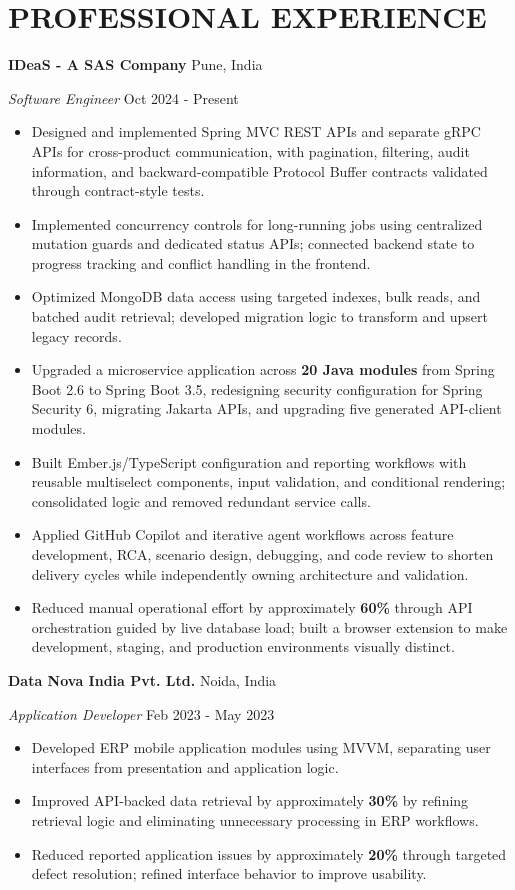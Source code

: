 \documentclass[a4paper,10pt]{article}
\begin{document}
\section{PROFESSIONAL EXPERIENCE}
\textbf{IDeaS - A SAS Company} \hfill Pune, India\par
\textit{Software Engineer} \hfill Oct 2024 - Present\par
\begin{itemize}
\item Designed and implemented Spring MVC REST APIs and separate gRPC APIs for cross-product communication, with pagination, filtering, audit information, and backward-compatible Protocol Buffer contracts validated through contract-style tests.
\item Implemented concurrency controls for long-running jobs using centralized mutation guards and dedicated status APIs; connected backend state to progress tracking and conflict handling in the frontend.
\item Optimized MongoDB data access using targeted indexes, bulk reads, and batched audit retrieval; developed migration logic to transform and upsert legacy records.
\item Upgraded a microservice application across \textbf{20 Java modules} from Spring Boot 2.6 to Spring Boot 3.5, redesigning security configuration for Spring Security 6, migrating Jakarta APIs, and upgrading five generated API-client modules.
\item Built Ember.js/TypeScript configuration and reporting workflows with reusable multiselect components, input validation, and conditional rendering; consolidated logic and removed redundant service calls.
\item Applied GitHub Copilot and iterative agent workflows across feature development, RCA, scenario design, debugging, and code review to shorten delivery cycles while independently owning architecture and validation.
\item Reduced manual operational effort by approximately \textbf{60\%} through API orchestration guided by live database load; built a browser extension to make development, staging, and production environments visually distinct.
\end{itemize}
\vspace{3pt}
\textbf{Data Nova India Pvt. Ltd.} \hfill Noida, India\par
\textit{Application Developer} \hfill Feb 2023 - May 2023\par
\begin{itemize}
\item Developed ERP mobile application modules using MVVM, separating user interfaces from presentation and application logic.
\item Improved API-backed data retrieval by approximately \textbf{30\%} by refining retrieval logic and eliminating unnecessary processing in ERP workflows.
\item Reduced reported application issues by approximately \textbf{20\%} through targeted defect resolution; refined interface behavior to improve usability.
\end{itemize}
\end{document}
